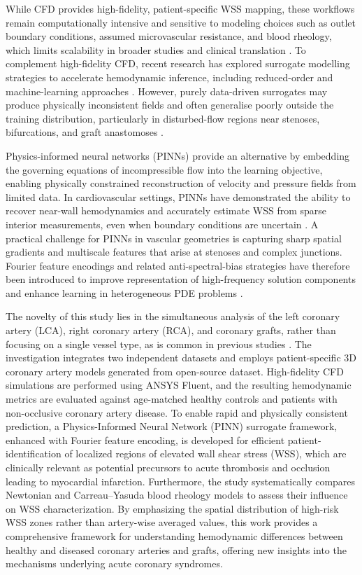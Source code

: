 ﻿\documentclass[12pt,a4paper]{article}
\theoremstyle{definition}
\numberwithin{equation}{section}
\begin{document}
While CFD provides high-fidelity, patient-specific WSS mapping, these workflows remain computationally intensive and sensitive to modeling choices such as outlet boundary conditions, assumed microvascular resistance, and blood rheology, which limits scalability in broader studies and clinical translation \cite{57, 105}. To complement high-fidelity CFD, recent research has explored surrogate modelling strategies to accelerate hemodynamic inference, including reduced-order and machine-learning approaches \cite{106}. However, purely data-driven surrogates may produce physically inconsistent fields and often generalise poorly outside the training distribution, particularly in disturbed-flow regions near stenoses, bifurcations, and graft anastomoses \cite{97}.

Physics-informed neural networks (PINNs) provide an alternative by embedding the governing equations of incompressible flow into the learning objective, enabling physically constrained reconstruction of velocity and pressure fields from limited data. In cardiovascular settings, PINNs have demonstrated the ability to recover near-wall hemodynamics and accurately estimate WSS from sparse interior measurements, even when boundary conditions are uncertain \cite{93}. A practical challenge for PINNs in vascular geometries is capturing sharp spatial gradients and multiscale features that arise at stenoses and complex junctions. Fourier feature encodings and related anti-spectral-bias strategies have therefore been introduced to improve representation of high-frequency solution components and enhance learning in heterogeneous PDE problems \cite{90, 107}. 

The novelty of this study lies in the {simultaneous analysis of the left coronary artery (LCA), right coronary artery (RCA), and coronary grafts}, rather than focusing on a single vessel type, as is common in previous studies \cite{9,10,11}. The investigation integrates {two independent datasets} and employs {patient-specific 3D coronary artery models} generated from open-source dataset. High-fidelity CFD simulations are performed using {ANSYS Fluent}, and the resulting hemodynamic metrics are evaluated against {age-matched healthy controls and patients with non-occlusive coronary artery disease}. To enable rapid and physically consistent prediction, a {Physics-Informed Neural Network (PINN) surrogate framework}, enhanced with {Fourier feature encoding}, is developed for efficient patient-{identification of localized regions of elevated wall shear stress (WSS)}, which are clinically relevant as potential precursors to acute thrombosis and occlusion leading to myocardial infarction. Furthermore, the study systematically compares {Newtonian and Carreau--Yasuda blood rheology models} to assess their influence on WSS characterization. By emphasizing the {spatial distribution of high-risk WSS zones rather than artery-wise averaged values}, this work provides a comprehensive framework for understanding hemodynamic differences between healthy and diseased coronary arteries and grafts, offering new insights into the mechanisms underlying acute coronary syndromes.
\end{document}
